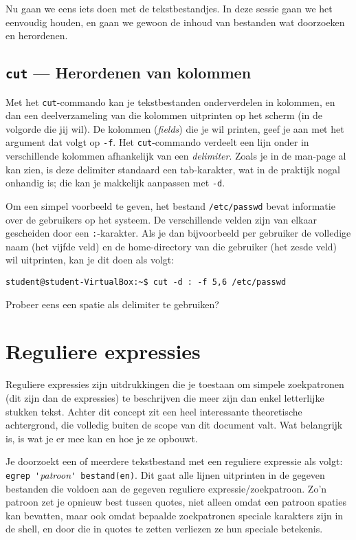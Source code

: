 \documentclass[a4paper,twoside,openany]{memoir}
\begin{document}
Nu gaan we eens iets doen met de tekstbestandjes. In deze sessie gaan we het eenvoudig houden, en gaan we gewoon de inhoud van bestanden wat doorzoeken en herordenen.

\section{\texttt{cut} --- Herordenen van kolommen}

Met het \verb!cut!-commando kan je tekstbestanden onderverdelen in kolommen, en dan een deelverzameling van die kolommen uitprinten op het scherm (in de volgorde die jij wil). De kolommen (\emph{fields}) die je wil printen, geef je aan met het argument dat volgt op \verb!-f!. Het \verb!cut!-commando verdeelt een lijn onder in verschillende kolommen afhankelijk van een \emph{delimiter}. Zoals je in de man-page al kan zien, is deze delimiter standaard een tab-karakter, wat in de praktijk nogal onhandig is; die kan je makkelijk aanpassen met \verb!-d!.

Om een simpel voorbeeld te geven, het bestand \verb!/etc/passwd! bevat informatie over de gebruikers op het systeem. De verschillende velden zijn van elkaar gescheiden door een \verb!:!-karakter. Als je dan bijvoorbeeld per gebruiker de volledige naam (het vijfde veld) en de home-directory van die gebruiker (het zesde veld) wil uitprinten, kan je dit doen als volgt:

\begin{verbatim}
student@student-VirtualBox:~$ cut -d : -f 5,6 /etc/passwd
\end{verbatim}

Probeer eens een spatie als delimiter te gebruiken?

\chapter{Reguliere expressies}

Reguliere expressies zijn uitdrukkingen die je toestaan om simpele zoekpatronen (dit zijn dan de expressies) te beschrijven die meer zijn dan enkel letterlijke stukken tekst. Achter dit concept zit een heel interessante theoretische achtergrond, die volledig buiten de scope van dit document valt. Wat belangrijk is, is wat je er mee kan en hoe je ze opbouwt.

Je doorzoekt een of meerdere tekstbestand met een reguliere expressie als volgt: \verb!egrep '!\emph{patroon}\verb!' bestand(en)!. Dit gaat alle lijnen uitprinten in de gegeven bestanden die voldoen aan de gegeven reguliere expressie/zoekpatroon. Zo'n patroon zet je opnieuw best tussen quotes, niet alleen omdat een patroon spaties kan bevatten, maar ook omdat bepaalde zoekpatronen speciale karakters zijn in de shell, en door die in quotes te zetten verliezen ze hun speciale betekenis.
\end{document}

